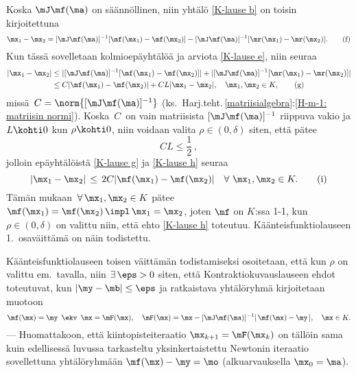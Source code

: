 Koska $\mJ\mf(\ma)$ on säännöllinen, niin yhtälö \eqref{K-lause b} on toisin kirjoitettuna
\begin{equation} \label{K-lause f}
\mx_1-\mx_2 = [\mJ\mf(\ma)]^{-1}[\mf(\mx_1)-\mf(\mx_2)]
             -[\mJ\mf(\ma)]^{-1}[\mr(\mx_1)-\mr(\mx_2)]. \tag{f}
\end{equation}
Kun tässä sovelletaan kolmioepäyhtälöä ja arviota \eqref{K-lause e}, niin seuraa
\begin{align} \label{K-lause g}
|\mx_1-\mx_2| 
          &\le |[\mJ\mf(\ma)]^{-1}[\mf(\mx_1)-\mf(\mx_2)]|
              +|[\mJ\mf(\ma)]^{-1}[\mr(\mx_1)-\mr(\mx_2)]|  \notag \\
          &\le C|\mf(\mx_1)-\mf(\mx_2)| + CL|\mx_1-\mx_2|, \quad \mx_1,\mx_2 \in K, \tag{g}
\end{align}
missä $\,C=\norm{[\mJ\mf(\ma)]^{-1}}$ (ks.\ 
Harj.teht.\,\ref{matriisialgebra}:\ref{H-m-1: matriisin normi}). Koska $\,C\,$ on vain
matriisista $[\mJ\mf(\ma)]^{-1}$ riippuva vakio ja $L \kohti 0$ kun $\rho \kohti 0$, niin
voidaan valita $\rho\in(0,\delta)$ siten, että pätee
\begin{equation} \label{K-lause h}
CL\le\frac{1}{2}\,, \tag{h}
\end{equation}
jolloin epäyhtälöistä \eqref{K-lause g} ja \eqref{K-lause h} seuraa
\begin{equation} \label{K-lause i}
|\mx_1-\mx_2| \,\le\, 2C|\mf(\mx_1)-\mf(\mx_2)| \quad \forall\ \mx_1,\mx_2 \in K. \tag{i}
\end{equation}
Tämän mukaan $\,\forall\,\mx_1,\mx_2 \in K$ pätee $\mf(\mx_1)=\mf(\mx_2)\,\impl\,\mx_1=\mx_2$,
joten $\mf$ on $K$:ssa 1-1, kun $\rho\in(0,\delta)$ on valittu niin, että ehto
\eqref{K-lause h} toteutuu. Käänteisfunktiolauseen 1.\ osaväittämä on näin todistettu.

Käänteisfunktiolauseen toisen väittämän todistamiseksi osoitetaan, että kun $\rho$ on valittu
em.\ tavalla, niin $\exists\,\eps>0$ siten, että Kontraktiokuvauslauseen ehdot
toteutuvat, kun $|\my-\mb|\le\eps$ ja ratkaistava yhtälöryhmä kirjoitetaan muotoon
\[
\mf(\mx)=\my\,\ \ekv\,\ \mx=\mF(\mx), \quad \mF(\mx)=\mx-[\mJ\mf(\ma)]^{-1}[\,\mf(\mx)-\my\,],
                                      \quad \mx \in K.
\]
--- Huomattakoon, että kiintopisteiteraatio $\mx_{k+1}=\mF(\mx_k)$ on tällöin sama kuin
edellisessä luvussa tarkasteltu yksinkertaistettu Newtonin iteraatio sovellettuna yhtälöryhmään
$\mf(\mx)-\my=\mo$ (alkuarvauksella $\mx_0=\ma$).

